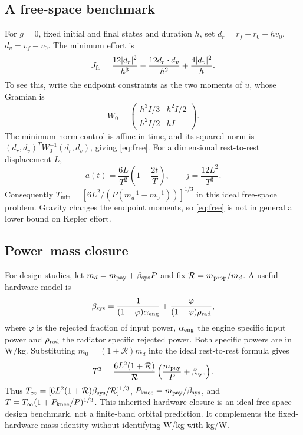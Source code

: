 \subsection{A free-space benchmark}
For $g=0$, fixed initial and final states and duration $h$, set
$d_r=r_f-r_0-hv_0$, $d_v=v_f-v_0$. The minimum effort is
\begin{equation}
 J_{\rm fs}=
 \frac{12|d_r|^2}{h^3}
 -\frac{12d_r\cdot d_v}{h^2}
 +\frac{4|d_v|^2}{h}.
 \label{eq:free}
\end{equation}
To see this, write the endpoint constraints as the two moments of $u$,
whose Gramian is
\begin{equation}
 W_0=\begin{pmatrix}h^3I/3&h^2I/2\\h^2I/2&hI\end{pmatrix}.
\end{equation}
The minimum-norm control is affine in time, and its squared norm is
$(d_r,d_v)^TW_0^{-1}(d_r,d_v)$, giving \eqref{eq:free}.
For a dimensional rest-to-rest displacement $L$,
\begin{equation}
 a(t)=\frac{6L}{T^2}\left(1-\frac{2t}{T}\right),\qquad
 j=\frac{12L^2}{T^3}.
\end{equation}
Consequently
$T_{\min}=[6L^2/(P(m_d^{-1}-m_0^{-1}))]^{1/3}$
in this ideal free-space problem.
Gravity changes the endpoint moments, so \eqref{eq:free} is not in
general a lower bound on Kepler effort.


\subsection{Power--mass closure}
For design studies, let $m_d=m_{\rm pay}+\beta_{\rm sys}P$ and fix
$\mathcal R=m_{\rm prop}/m_d$. A useful hardware model is
\[
\beta_{\rm sys}=\frac{1}{(1-\varphi)\alpha_{\rm eng}}
+\frac{\varphi}{(1-\varphi)\rho_{\rm rad}},
\]
where $\varphi$ is the rejected fraction of input power,
$\alpha_{\rm eng}$ the engine specific input power and $\rho_{\rm rad}$
the radiator specific rejected power. Both specific powers are in W/kg.
Substituting $m_0=(1+\mathcal R)m_d$ into the ideal rest-to-rest formula gives
\begin{equation}
 T^3=\frac{6L^2(1+\mathcal R)}{\mathcal R}
          \left(\frac{m_{\rm pay}}P+\beta_{\rm sys}\right).
\end{equation}
Thus $T_\infty=[6L^2(1+\mathcal R)\beta_{\rm sys}/\mathcal R]^{1/3}$,
$P_{\rm knee}=m_{\rm pay}/\beta_{\rm sys}$, and
$T=T_\infty(1+P_{\rm knee}/P)^{1/3}$. This inherited hardware closure
\cite{OriginalKepler} is an ideal free-space design benchmark, not a
finite-band orbital prediction. It complements the fixed-hardware mass
identity without identifying W/kg with kg/W.
